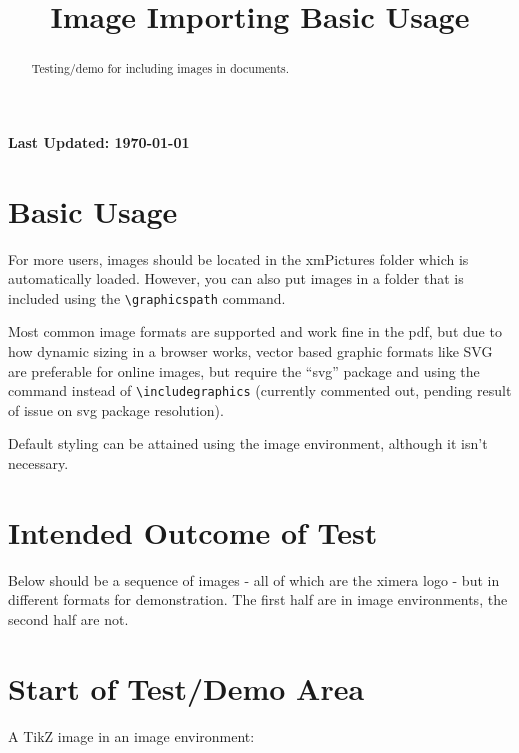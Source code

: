 \documentclass{ximera}
\title{Image Importing Basic Usage}
\begin{document}
\begin{abstract}
    Testing/demo for including images in documents.
\end{abstract}
\maketitle

{{\Huge \bfseries Last Updated: \today}} \\


\section{Basic Usage}
For more users, images should be located in the xmPictures folder which is automatically loaded.
However, you can also put images in a folder that is included using the \verb|\graphicspath| command.

Most common image formats are supported and work fine in the pdf, but due to how dynamic sizing in a browser works,
vector based graphic formats like SVG are preferable for online images, but require the ``svg'' package and using 
the command \verb|| instead of \verb|\includegraphics| (currently commented out, pending result of issue on svg package resolution).

Default styling can be attained using the image environment, although it isn't necessary.

\section{Intended Outcome of Test}
Below should be a sequence of images - all of which are the ximera logo - but in different formats for demonstration. 
The first half are in image environments, the second half are not.

\section{Start of Test/Demo Area}


A TikZ image in an image environment:
\begin{image}
  \end{image}
\end{document}

